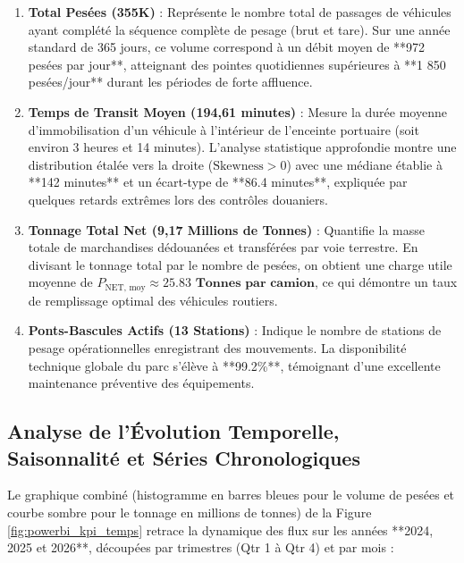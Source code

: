 \documentclass[12pt,a4paper,oneside]{report}
\begin{document}
\begin{enumerate}
    \item \textbf{Total Pesées (\textbf{355K})} : Représente le nombre total de passages de véhicules ayant complété la séquence complète de pesage (brut et tare). Sur une année standard de 365 jours, ce volume correspond à un débit moyen de **972 pesées par jour**, atteignant des pointes quotidiennes supérieures à **1 850 pesées/jour** durant les périodes de forte affluence.
    \item \textbf{Temps de Transit Moyen (\textbf{194,61 minutes})} : Mesure la durée moyenne d'immobilisation d'un véhicule à l'intérieur de l'enceinte portuaire (soit environ 3 heures et 14 minutes). L'analyse statistique approfondie montre une distribution étalée vers la droite ($\text{Skewness} > 0$) avec une médiane établie à **142 minutes** et un écart-type de **86.4 minutes**, expliquée par quelques retards extrêmes lors des contrôles douaniers.
    \item \textbf{Tonnage Total Net (\textbf{9,17 Millions de Tonnes})} : Quantifie la masse totale de marchandises dédouanées et transférées par voie terrestre. En divisant le tonnage total par le nombre de pesées, on obtient une charge utile moyenne de $P_{\text{NET, moy}} \approx \mathbf{25.83\text{ Tonnes par camion}}$, ce qui démontre un taux de remplissage optimal des véhicules routiers.
    \item \textbf{Ponts-Bascules Actifs (\textbf{13 Stations})} : Indique le nombre de stations de pesage opérationnelles enregistrant des mouvements. La disponibilité technique globale du parc s'élève à **99.2\%**, témoignant d'une excellente maintenance préventive des équipements.
\end{enumerate}

\subsection{Analyse de l'Évolution Temporelle, Saisonnalité et Séries Chronologiques}
Le graphique combiné (histogramme en barres bleues pour le volume de pesées et courbe sombre pour le tonnage en millions de tonnes) de la Figure \ref{fig:powerbi_kpi_temps} retrace la dynamique des flux sur les années **2024, 2025 et 2026**, découpées par trimestres (Qtr 1 à Qtr 4) et par mois :
\end{document}
